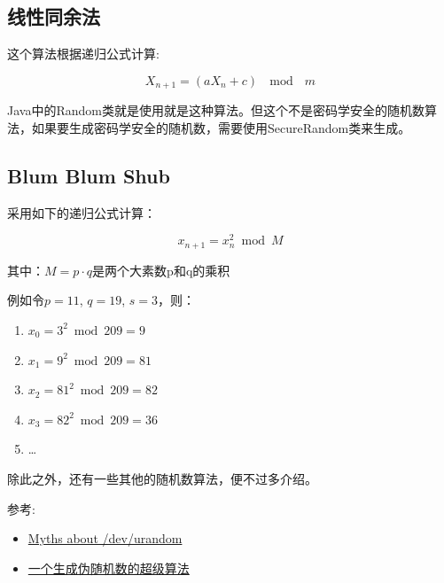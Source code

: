 \documentclass[12pt]{article}
\begin{document}
\subsection{线性同余法}\label{ux7ebfux6027ux540cux4f59ux6cd5}

这个算法根据递归公式计算:

\[
X_{n+1}=\left(aX_{n}+c\right)~~{\bmod {~}}~m
\]

Java中的Random类就是使用就是这种算法。但这个不是密码学安全的随机数算法，如果要生成密码学安全的随机数，需要使用SecureRandom类来生成。

\subsection{Blum Blum Shub}\label{blum-blum-shub}

采用如下的递归公式计算：

\[
x_{n+1}=x_{n}^{2}{\bmod  M}
\]

其中：\(M=p\cdot q\)是两个大素数p和q的乘积

例如令\({\displaystyle p=11}\), \({\displaystyle q=19}\), \({\displaystyle s=3}\)，则：

\begin{enumerate}
\tightlist
\item
  \({\displaystyle x_{0}=3^{2}{\bmod 209}=9}\)
\item
  \({\displaystyle x_{1}=9^{2}{\bmod 209}=81}\)
\item
  \({\displaystyle x_{2}=81^{2}{\bmod 209}=82}\)
\item
  \({\displaystyle x_{3}=82^{2}{\bmod 209}=36}\)
\item
  \ldots{}
\end{enumerate}

除此之外，还有一些其他的随机数算法，便不过多介绍。

参考:

\begin{itemize}
\tightlist
\item
  \href{http://www.2uo.de/myths-about-urandom/}{Myths about /dev/urandom}
\item
  \href{http://www.cnblogs.com/Geometry/archive/2011/01/25/1944582.html}{一个生成伪随机数的超级算法}
\end{itemize}
\end{document}
